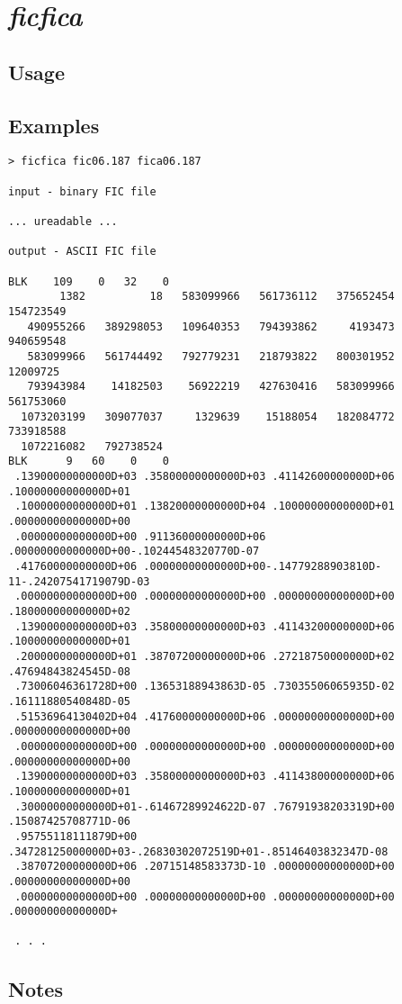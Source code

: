 \section{\emph{ficfica}}
\subsection{Usage}
\subsection{Examples}
\begin{Verbatim}
> ficfica fic06.187 fica06.187

input - binary FIC file

... ureadable ...

output - ASCII FIC file

BLK    109    0   32    0
        1382          18   583099966   561736112   375652454   154723549
   490955266   389298053   109640353   794393862     4193473   940659548
   583099966   561744492   792779231   218793822   800301952    12009725
   793943984    14182503    56922219   427630416   583099966   561753060
  1073203199   309077037     1329639    15188054   182084772   733918588
  1072216082   792738524
BLK      9   60    0    0
 .13900000000000D+03 .35800000000000D+03 .41142600000000D+06 .10000000000000D+01
 .10000000000000D+01 .13820000000000D+04 .10000000000000D+01 .00000000000000D+00
 .00000000000000D+00 .91136000000000D+06 .00000000000000D+00-.10244548320770D-07
 .41760000000000D+06 .00000000000000D+00-.14779288903810D-11-.24207541719079D-03
 .00000000000000D+00 .00000000000000D+00 .00000000000000D+00 .18000000000000D+02
 .13900000000000D+03 .35800000000000D+03 .41143200000000D+06 .10000000000000D+01
 .20000000000000D+01 .38707200000000D+06 .27218750000000D+02 .47694843824545D-08
 .73006046361728D+00 .13653188943863D-05 .73035506065935D-02 .16111880540848D-05
 .51536964130402D+04 .41760000000000D+06 .00000000000000D+00 .00000000000000D+00
 .00000000000000D+00 .00000000000000D+00 .00000000000000D+00 .00000000000000D+00
 .13900000000000D+03 .35800000000000D+03 .41143800000000D+06 .10000000000000D+01
 .30000000000000D+01-.61467289924622D-07 .76791938203319D+00 .15087425708771D-06
 .95755118111879D+00 .34728125000000D+03-.26830302072519D+01-.85146403832347D-08
 .38707200000000D+06 .20715148583373D-10 .00000000000000D+00 .00000000000000D+00
 .00000000000000D+00 .00000000000000D+00 .00000000000000D+00 .00000000000000D+

 . . .

\end{Verbatim}
\subsection{Notes}

